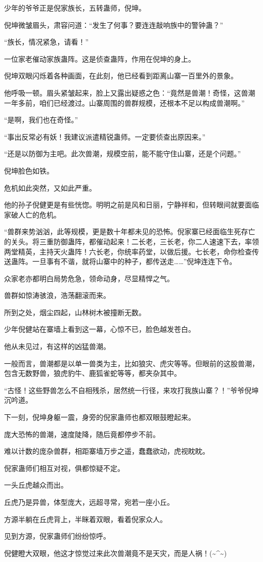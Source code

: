 \begin{this_body}
少年的爷爷正是倪家族长，五转蛊师，倪坤。

倪坤微皱眉头，肃容问道：“发生了何事？要连连敲响族中的警钟蛊？”

“族长，情况紧急，请看！”

一位家老催动家族蛊阵。这是侦查蛊阵，作用在倪坤的身上。

倪坤双眼闪烁着各种画面，在此刻，他已经看到距离山寨一百里外的景象。

他呼吸一顿。眉头紧皱起来，脸上又露出疑惑之色：“竟然是兽潮！奇怪，这兽潮一年多前，咱们已经渡过。山寨周围的兽群规模，还根本不足以构成兽潮啊。”

“是啊，我们也在奇怪。”

“事出反常必有妖！我建议派遣精锐蛊师。一定要侦查出原因来。”

“还是以防御为主吧。此次兽潮，规模空前，能不能守住山寨，还是个问题。”

倪坤脸色如铁。

危机如此突然，又如此严重。

他的孙子倪健更是有些恍惚。明明之前是风和日丽，宁静祥和，但转眼间就要面临家破人亡的危机。

“兽群来势汹汹，此等规模，更是数十年都未见的恐怖。倪家寨已经面临生死存亡的关头。将三重防御蛊阵，都催动起来！二长老，三长老，你二人速速下去，率领两堂精英，主持天火蛊阵！六长老，你统率药堂，以做后援。七长老，命你检查传送蛊阵。一旦事有不谐，就将山寨中的种子，都传送走……”倪坤连连下令。

众家老亦都明白局势危急，领命动身，尽显精悍之气。

兽群如惊涛骇浪，浩荡翻滚而来。

所到之处，烟尘四起，山林树木被撞断无数。

少年倪健站在寨墙上看到这一幕，心惊不已，脸色越发苍白。

他从未见过，有这样的凶猛兽潮。

一般而言，兽潮都是以单一兽类为主，比如狼灾、虎灾等等。但眼前的这股兽潮，包含无数野兽，狼虎豹牛、鹿狐雀蛇等等，都夹杂其中。

“古怪！这些野兽怎么不自相残杀，居然统一行径，来攻打我族山寨？！”爷爷倪坤沉吟道。

下一刻，倪坤身躯一震，身旁的倪家蛊师也都双眼鼓瞪起来。

庞大恐怖的兽潮，速度陡降，随后竟都停步不前。

难以计数的庞杂兽群，相距寨墙万步之遥，蠢蠢欲动，虎视眈眈。

倪家蛊师们相互对视，俱都惊疑不定。

一头丘虎越众而出。

丘虎乃是异兽，体型庞大，远超寻常，宛若一座小丘。

方源半躺在丘虎背上，半眯着双眼，看着倪家众人。

见到方源，倪家蛊师们纷纷惊呼。

倪健瞪大双眼，他这才惊觉过来此次兽潮竟不是天灾，而是人祸！(\~{}\^{}\~{})

\end{this_body}

